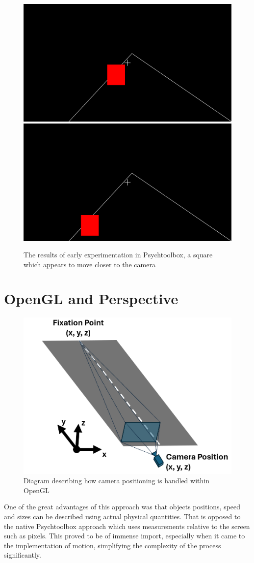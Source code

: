 \begin{figure}[hbt!]
    \centering
    \includegraphics[width=0.45\linewidth]{figures/Slide1.png} \hfill
    \includegraphics[width=0.45\linewidth]{figures/Slide2.png}
    \caption{The results of early experimentation in Psychtoolbox, a square which appears to move closer to the camera}
    \label{fig:EarlyPsychExp}
\end{figure}

\section{OpenGL and Perspective}

\begin{figure}[hbt!]
    \centering
    \includegraphics[width=0.45\linewidth]{figures/Camera Positioning.png}
    \caption{Diagram describing how camera positioning is handled within OpenGL}
    \label{fig:CameraPos}
\end{figure}



One of the great advantages of this approach was that objects positions, speed and sizes can be described using actual physical quantities. That is opposed to the native Psychtoolbox approach which uses measurements relative to the screen such as pixels. This proved to be of immense import, especially when it came to the implementation of motion, simplifying the complexity of the process significantly.

